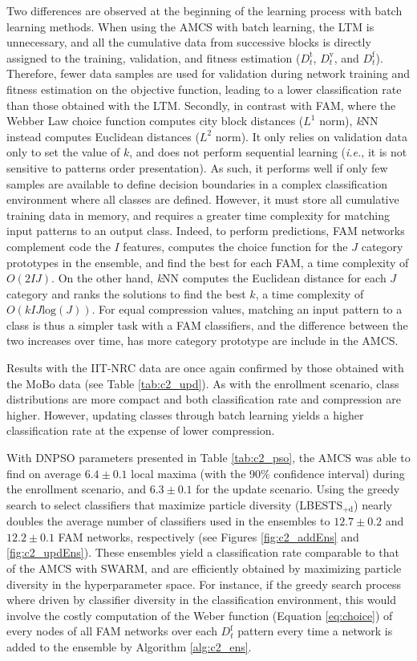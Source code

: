 Two differences are observed at the beginning of the learning process with batch learning methods.
When using the AMCS with batch learning, the LTM is unnecessary, and all the cumulative data from successive blocks is directly assigned to the training, validation, and fitness estimation ($D_t^\text{t}$, $D_t^\text{v}$, and $D_t^\text{f}$).
Therefore, fewer data samples are used for validation during network training and fitness estimation on the objective function, leading to a lower classification rate than those obtained with the LTM.
Secondly, in contrast with FAM, where the Webber Law choice function computes city block distances ($L^1$ norm), \textit{k}NN instead computes Euclidean distances ($L^2$ norm).
It only relies on validation data only to set the value of $k$, and does not perform sequential learning (\emph{i.e.}, it is not sensitive to patterns order presentation).
As such, it performs well if only few samples are available to define decision boundaries in a complex classification environment where all classes are defined.
However, it must store all cumulative training data in memory, and requires a greater time complexity for matching input patterns to an output class.
Indeed, to perform predictions, FAM networks complement code the $I$ features, computes the choice function for the $J$ category prototypes in the ensemble, and find the best for each FAM, a time complexity of $O(2IJ)$.
On the other hand, \textit{k}NN computes the Euclidean distance for each $J$ category and ranks the solutions to find the best $k$, a time complexity of $O(kI J\text{log}(J))$.
For equal compression values, matching an input pattern to a class is thus a simpler task with a FAM classifiers, and the difference between the two increases over time, has more category prototype are include in the AMCS.

Results with the IIT-NRC data are once again confirmed by those obtained with the MoBo data (see Table \ref{tab:c2_upd}).
As with the enrollment scenario, class distributions are more compact and both classification rate and compression are higher.
However, updating classes through batch learning yields a higher classification rate at the expense of lower compression.

With DNPSO parameters presented in Table \ref{tab:c2_pso}, the AMCS was able to find on average $6.4\pm0.1$ local maxima (with the 90\% confidence interval) during the enrollment scenario, and $6.3\pm0.1$ for the update scenario.
Using the greedy search to select classifiers that maximize particle diversity (LBESTS$_\text{+d}$) nearly doubles the average number of classifiers used in the ensembles to $12.7\pm0.2$ and $12.2\pm0.1$ FAM networks, respectively (see Figures \ref{fig:c2_addEns} and \ref{fig:c2_updEns}).
These ensembles yield a classification rate comparable to that of the AMCS with SWARM, and are efficiently obtained by maximizing particle diversity in the hyperparameter space.
For instance, if the greedy search process where driven by classifier diversity in the classification environment, this would involve the costly computation of the Weber function (Equation \ref{eq:choice}) of every nodes of all FAM networks over each $D_t^\text{f}$ pattern every time a network is added to the ensemble by Algorithm \ref{alg:c2_ens}.

